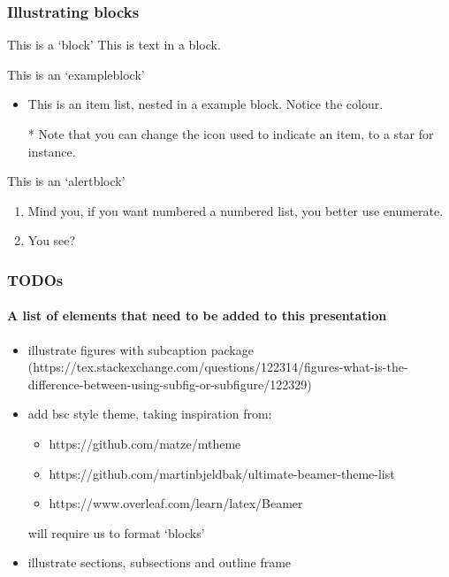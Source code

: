 \documentclass[aspectratio=169]{beamer} %
\begin{document}
\begin{frame}[t]
	\frametitle{Illustrating blocks}

	\begin{block}{This is a `block'}
		This is text in a block.
	\end{block}

	\begin{exampleblock}{This is an `exampleblock'}
		\begin{itemize}
			\item This is an item list, nested in a example block. Notice the colour.
			\item[*] Note that you can change the icon used to indicate an item, to a star for instance.
		\end{itemize}		
	\end{exampleblock}
	
	\begin{alertblock}{This is an `alertblock'}
		\begin{enumerate}
			\item Mind you, if you want numbered a numbered list, you better use enumerate.
			\item You see?
		\end{enumerate}
	\end{alertblock}
	
\end{frame}

\begin{frame}[t]
	\frametitle{TODOs}
	\framesubtitle{A list of elements that need to be added to this presentation}
	\begin{itemize}
		\item illustrate figures with subcaption package (https://tex.stackexchange.com/questions/122314/figures-what-is-the-difference-between-using-subfig-or-subfigure/122329)
		\item add bsc style theme, taking inspiration from:
		\begin{itemize}
			\item https://github.com/matze/mtheme
			\item https://github.com/martinbjeldbak/ultimate-beamer-theme-list
			\item https://www.overleaf.com/learn/latex/Beamer 
		\end{itemize}
		will require us to format `blocks'
	\item illustrate sections, subsections and outline frame 
	\end{itemize}
\end{frame}
\end{document}
